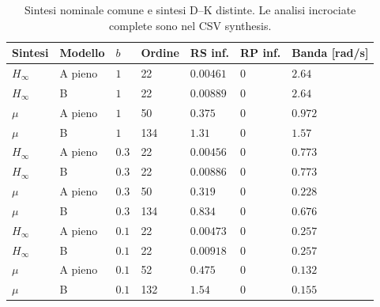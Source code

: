 \begin{table}[htbp]\centering\small
\begin{tabular}{lllllll}\toprule
Sintesi & Modello & $b$ & Ordine & RS inf. & RP inf. & Banda [rad/s]\\\midrule
$H_\infty$ & A pieno & $1$ & 22 & $0.00461$ & $0$ & $2.64$\\
$H_\infty$ & B & $1$ & 22 & $0.00889$ & $0$ & $2.64$\\
$\mu$ & A pieno & $1$ & 50 & $0.375$ & $0$ & $0.972$\\
$\mu$ & B & $1$ & 134 & $1.31$ & $0$ & $1.57$\\
$H_\infty$ & A pieno & $0.3$ & 22 & $0.00456$ & $0$ & $0.773$\\
$H_\infty$ & B & $0.3$ & 22 & $0.00886$ & $0$ & $0.773$\\
$\mu$ & A pieno & $0.3$ & 50 & $0.319$ & $0$ & $0.228$\\
$\mu$ & B & $0.3$ & 134 & $0.834$ & $0$ & $0.676$\\
$H_\infty$ & A pieno & $0.1$ & 22 & $0.00473$ & $0$ & $0.257$\\
$H_\infty$ & B & $0.1$ & 22 & $0.00918$ & $0$ & $0.257$\\
$\mu$ & A pieno & $0.1$ & 52 & $0.475$ & $0$ & $0.132$\\
$\mu$ & B & $0.1$ & 132 & $1.54$ & $0$ & $0.155$\\
\bottomrule\end{tabular}
\caption{Sintesi nominale comune e sintesi D--K distinte. Le analisi incrociate complete sono nel CSV synthesis.}
\end{table}
